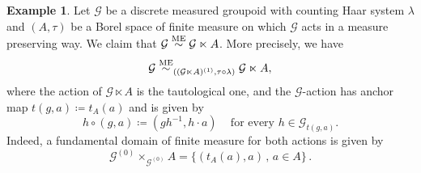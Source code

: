 \documentclass[11pt, oneside]{amsart}
\theoremstyle{definition}
\newtheorem{example}[lemma]{Example}
\theoremstyle{remark}
\theoremstyle{TheoremNum}
\newcommand{\cG}{\mathcal{G}}
\newcommand{\ME}{\overset{\textup{ME}}{\sim}}
\begin{document}
\begin{example}\label{example:ME}
Let $\mathcal{G}$ be a discrete measured groupoid with counting Haar system $\lambda$ and $(A,\tau)$ be a Borel space of finite measure on which $\mathcal{G}$ acts in a measure preserving way. 
We claim that $\cG \ME \cG\ltimes A$. More precisely, we have
\[
\cG \ME_{((\mathcal{G}\ltimes A)^{(1)}, \tau \circ \lambda)} \cG \ltimes A,
\]
where the action of $\cG \ltimes A$ is the tautological one, and the $\cG$-action has anchor map $t(g,a)\coloneqq t_A(a)$ and is given by
$$h\circ  (g,a)\coloneqq (gh^{-1},h\cdot a)\, \quad \text{for every }h \in \mathcal{G}_{t(g,a)}.$$ 
Indeed, a fundamental domain of finite measure for both actions is given by 
$$\mathcal{G}^{(0)}\times_{\mathcal{G}^{(0)}} A=\{ (t_A(a),a)\,,\, a\in A \}\,.$$
\end{example}
\end{document}
